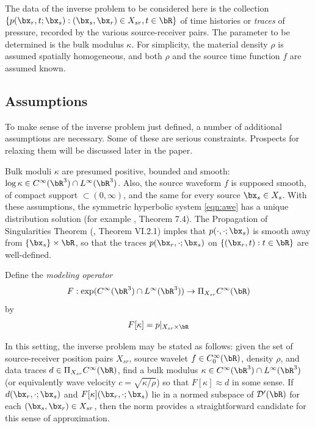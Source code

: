 The data of the inverse problem to be considered here is the
collection $\{p(\bx_r,t;\bx_s): (\bx_s,\bx_r) \in X_{sr}, t \in \bR\}$ of time
histories or {\em traces} of pressure, recorded by the various source-receiver pairs.
The parameter to be determined is
the bulk modulus $\kappa$.  For simplicity, the material density
$\rho$ is assumed spatially homogeneous, and both $\rho$ and the
source time function $f$ are assumed known.

\subsection{Assumptions}

To make sense of the inverse problem just defined, a number of
additional assumptions are necessary. Some of these are serious
constraints. Prospects for relaxing them will be discussed
later in the paper.

Bulk moduli $\kappa$ are presumed positive, bounded and smooth:
$\log \kappa \in C^{\infty}(\bR^3) \cap L^{\infty}(\bR^3)$. Also, the
source waveform $f$ is supposed smooth, of compact support
$ \subset (0,\infty)$, and the same for every source $\bx_s \in
X_s$. With these assumptions, the symmetric hyperbolic system
\ref{eqn:awe} has a unique distribution solution (for example
\cite{Lax:PDENotes}, Theorem 7.4). The Propagation of Singularities
Theorem (\cite{Tay:81}, Theorem VI.2.1) %
imples that $p(\cdot,\cdot;\bx_s)$ is smooth away from $\{\bx_s\}
\times \bR$, so that the traces $p(\bx_r, \cdot;\bx_s)$ on
$\{(\bx_r,t): t \in \bR\}$ are well-defined.

Define the {\em modeling operator}
\begin{equation}
  \label{eqn:modop}
  F: \exp(C^{\infty}(\bR^3) \cap
L^{\infty}(\bR^3))  \rightarrow \Pi_{X_{sr}} C^{\infty}(\bR)
\end{equation}
by
\begin{equation}
  \label{eqn:modopdef}
  F[\kappa]= p|_{X_{sr} \times \bR}
\end{equation}

In this setting, the inverse problem may be stated as follows: given the set of
source-receiver position pairs $X_{sr}$, source wavelet
$f \in C_0^{\infty}(\bR)$,  density $\rho$, and data traces
$d \in \Pi_{X_{sr}} C^{\infty}(\bR)$, find a bulk modulus $
\kappa \in C^{\infty}(\bR^3) \cap
L^{\infty}(\bR^3)$
(or equivalently wave velocity $c=\sqrt{\kappa/\rho}$)
so that $F[\kappa] \approx d$ in some sense. If
$d(\bx_r,\cdot;\bx_s)$ and $F[\kappa](\bx_r,\cdot;\bx_s)$ lie in a normed subspace of ${\cal D}'(\bR)$ for each
$(\bx_s,\bx_r) \in X_{sr}$, then the
norm provides a straightforward candidate for this sense of
approximation.

